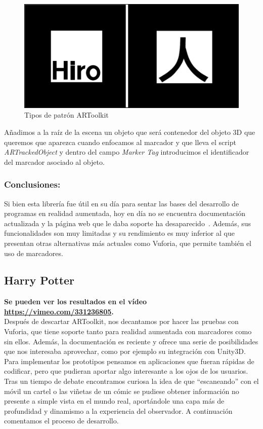 \begin{figure}[H]
    \centering
    \includegraphics[width=0.7\linewidth]{Images/Patron_ARTK.png}
    \caption{Tipos de patrón ARToolkit\footnotemarker}
    \label{TipoARTK}
\end{figure}

Añadimos a la raíz de la escena un objeto que será contenedor del objeto 3D que queremos que aparezca cuando enfocamos al marcador y que lleva el script \textit{ARTrackedObject} y dentro del campo \textit{Marker Tag} introducimos el identificador del marcador asociado al objeto.\\

\subsubsection{Conclusiones:}
Si bien esta librería fue útil en su día para sentar las bases del desarrollo de programas en realidad aumentada, hoy en día no se encuentra  documentación actualizada  y la página web que le daba soporte ha desaparecido~\cite{artoolkit_web}. Además, sus funcionalidades son muy limitadas y su rendimiento es muy inferior al que presentan otras alternativas más actuales como Vuforia, que permite también el uso de marcadores.\\

\subsection{Harry Potter}
\textbf{Se pueden ver los resultados en el vídeo \url{https://vimeo.com/331236805}.}\\

Después de descartar ARToolkit, nos decantamos por hacer las pruebas con Vuforia, que tiene soporte tanto para realidad aumentada con marcadores como sin ellos. Además, la documentación es reciente y ofrece una serie de posibilidades que nos interesaba aprovechar, como por ejemplo su integración con Unity3D.\\

Para implementar los prototipos pensamos en aplicaciones que fueran rápidas de codificar, pero que pudieran aportar algo interesante a los ojos de los usuarios. Tras un tiempo de debate encontramos curiosa la idea de que “escaneando” con el móvil un cartel o las viñetas de un cómic se pudiese obtener información no presente a simple vista en el mundo real, aportándole una capa más de profundidad y dinamismo a la experiencia del observador. A continuación comentamos el proceso de desarrollo.\\

